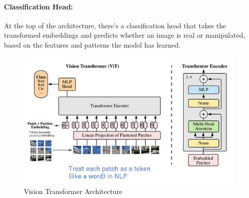 \paragraph{Classification Head:}
At the top of the architecture, there's a classification head that takes the transformed embeddings and predicts whether an image is real or manipulated, based on the features and patterns the model has learned.

\begin{figure}[htbp]
    \centering
    \includegraphics[width=6in]{img/visiontransformer.png}
    \caption{Vision Transformer Architecture}
\end{figure}

\newpage
